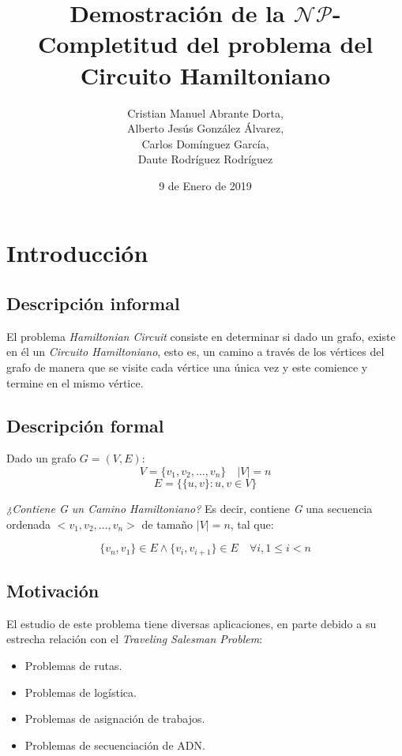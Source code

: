\documentclass[a4paper]{article}
\title{Demostración de la $\mathcal{NP}$-Completitud del problema del Circuito Hamiltoniano}
\author{Cristian Manuel Abrante Dorta, \\ Alberto Jesús González Álvarez, \\ Carlos Domínguez García, \\ Daute Rodríguez Rodríguez}
\date{9 de Enero de 2019}
\begin{document}
\maketitle

\newpage

\tableofcontents

\newpage

\section{Introducción}

\subsection{Descripción informal}

El problema \textit{Hamiltonian Circuit} consiste en determinar si dado un grafo, existe en él un \textit{Circuito Hamiltoniano}, esto es, un camino a través de los vértices del grafo de manera que se visite cada vértice una única vez y este comience y termine en el mismo vértice.

\subsection{Descripción formal}

Dado un grafo $G = (V, E)$:
\[V = \{v_{1}, v_{2}, \dots, v_{n}\}\quad|V| = n\]
\[E = \{\{u, v\}: u, v \in V\}\]

\textit{¿Contiene G un Camino Hamiltoniano?} Es decir, contiene \textit{G} una secuencia ordenada $<v_{1}, v_{2}, \dots, v_{n}>$ de tamaño $|V| = n$, tal que:

\[\{v_{n}, v_{1}\} \in E \land \{v_{i}, v_{i + 1}\} \in E \quad \forall i, 1 \leq i < n\]

\subsection{Motivación}

El estudio de este problema tiene diversas aplicaciones, en parte debido a su estrecha relación con el \textit{Traveling Salesman Problem}:
\begin{itemize}
    \item Problemas de rutas.
    \item Problemas de logística.
    \item Problemas de asignación de trabajos.
    \item Problemas de secuenciación de ADN.
\end{itemize}
\end{document}
